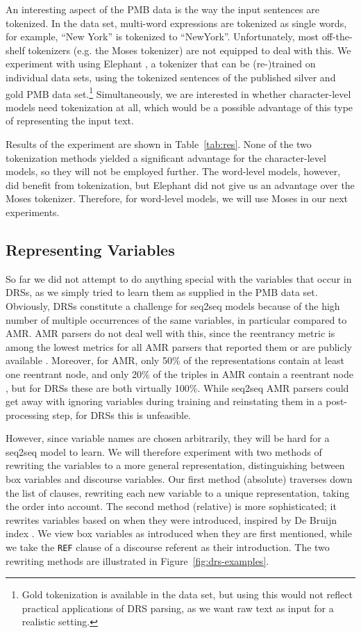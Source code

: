 \documentclass[11pt,a4paper]{article}
\begin{document}
An interesting aspect of the PMB data is the way the input sentences are tokenized. In the data set, multi-word expressions are tokenized as single words, for example, ``New York'' is tokenized to ``New\mytilde{}York''. Unfortunately, most off-the-shelf tokenizers (e.g. the Moses tokenizer) are not equipped to deal with this. We experiment with using Elephant \cite{elephant}, a tokenizer that can be (re-)trained on individual data sets, using the tokenized sentences of the published silver and gold PMB data set.\footnote{Gold tokenization is available in the data set, but using this would not reflect practical applications of DRS parsing, as we want raw text as input for a realistic setting.} Simultaneously, we are interested in whether character-level models need tokenization at all, which would be a possible advantage of this type of representing the input text.

Results of the experiment are shown in Table~\ref{tab:res}. None of the two tokenization methods yielded a significant advantage for the character-level models, so they will not be employed further. The word-level models, however, did benefit from tokenization, but Elephant did not give us an advantage over the Moses tokenizer. Therefore, for word-level models, we will use Moses in our next experiments.

\subsection{Representing Variables}

So far we did not attempt to do anything special with the variables that occur in DRSs, as we simply tried to learn them as supplied in the PMB data set. Obviously, DRSs constitute a challenge for seq2seq models because of the high number of multiple occurrences of the same variables, in particular compared to AMR. AMR parsers do not deal well with this, since the reentrancy metric \cite{damonte:17} is among the lowest metrics for all AMR parsers that reported them or are publicly available \cite{clinAMR:17}. Moreover, for AMR, only 50\% of the representations contain at least one reentrant node, and only 20\% of the triples in AMR contain a reentrant node \cite{semdeep:17}, but for DRSs these are both virtually 100\%.
While seq2seq AMR parsers could get away with ignoring variables during training and reinstating them in a post-processing step, for DRSs this is unfeasible.

However, since variable names are chosen arbitrarily, they will be hard for a seq2seq model to learn. We will therefore experiment with two methods of rewriting the variables to a more general representation, distinguishing between box variables and discourse variables. Our first method (absolute) traverses down the list of clauses, rewriting each new variable to a unique representation, taking the order into account. The second method (relative) is more sophisticated; it rewrites variables based on when they were introduced, inspired by De Bruijn index \cite{debruijn:72}. We view box variables as introduced when they are first mentioned, while we take the \texttt{REF} clause of a discourse referent as their introduction. The two rewriting methods are illustrated in Figure~\ref{fig:drs-examples}. 
\end{document}
